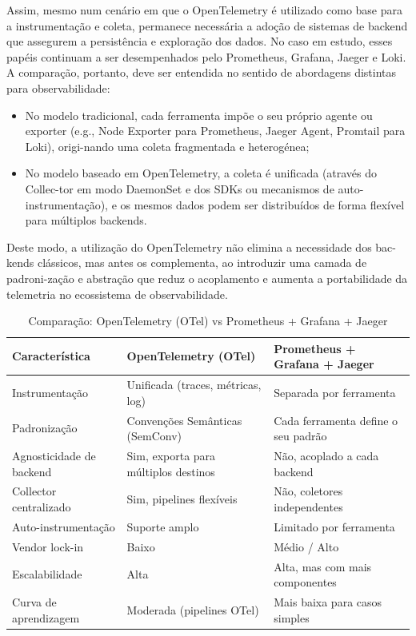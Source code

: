 Assim, mesmo num cenário em que o OpenTelemetry é utilizado como base para a instrumentação e coleta, permanece necessária a adoção de sistemas de backend que assegurem a persistência e exploração dos dados. No caso em estudo, esses papéis continuam a ser desempenhados pelo Prometheus, Grafana, Jaeger e Loki.
A comparação, portanto, deve ser entendida no sentido de abordagens distintas para observabilidade:
\begin{itemize}
    \item No modelo tradicional, cada ferramenta impõe o seu próprio agente ou exporter (e.g., Node Exporter para Prometheus, Jaeger Agent, Promtail para Loki), origi-nando uma coleta fragmentada e heterogénea;
    \item No modelo baseado em OpenTelemetry, a coleta é unificada (através do Collec-tor em modo DaemonSet e dos SDKs ou mecanismos de auto-instrumentação), e os mesmos dados podem ser distribuídos de forma flexível para múltiplos backends.
\end{itemize}

Deste modo, a utilização do OpenTelemetry não elimina a necessidade dos bac-kends clássicos, mas antes os complementa, ao introduzir uma camada de padroni-zação e abstração que reduz o acoplamento e aumenta a portabilidade da telemetria no ecossistema de observabilidade.

\begin{table}[H]
\centering
\caption{Comparação: OpenTelemetry (OTel) vs Prometheus + Grafana + Jaeger}
\label{tab:comparacao_otel_prometheus}
\begin{tabular}{|p{5cm}|p{5cm}|p{5cm}|}
\hline
\textbf{Característica} & \textbf{OpenTelemetry (OTel)} & \textbf{Prometheus + Grafana + Jaeger} \\
\hline
Instrumentação & Unificada (traces, métricas, log) & Separada por ferramenta \\
\hline
Padronização & Convenções Semânticas (SemConv) & Cada ferramenta define o seu padrão \\
\hline
Agnosticidade de backend & Sim, exporta para múltiplos destinos & Não, acoplado a cada backend \\
\hline
Collector centralizado & Sim, pipelines flexíveis & Não, coletores independentes \\
\hline
Auto-instrumentação & Suporte amplo & Limitado por ferramenta \\
\hline
Vendor lock-in & Baixo & Médio / Alto \\
\hline
Escalabilidade & Alta & Alta, mas com mais componentes \\
\hline
Curva de aprendizagem & Moderada (pipelines OTel) & Mais baixa para casos simples \\
\hline
\end{tabular}
\end{table}

